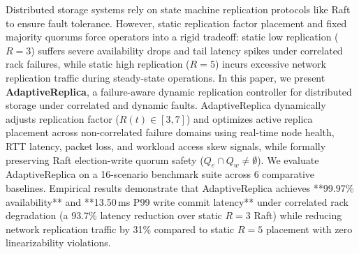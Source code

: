 Distributed storage systems rely on state machine replication protocols like Raft to ensure fault tolerance. However, static replication factor placement and fixed majority quorums force operators into a rigid tradeoff: static low replication ($R=3$) suffers severe availability drops and tail latency spikes under correlated rack failures, while static high replication ($R=5$) incurs excessive network replication traffic during steady-state operations. In this paper, we present \textbf{AdaptiveReplica}, a failure-aware dynamic replication controller for distributed storage under correlated and dynamic faults. AdaptiveReplica dynamically adjusts replication factor ($R(t) \in [3, 7]$) and optimizes active replica placement across non-correlated failure domains using real-time node health, RTT latency, packet loss, and workload access skew signals, while formally preserving Raft election-write quorum safety ($Q_e \cap Q_w \neq \emptyset$). We evaluate AdaptiveReplica on a 16-scenario benchmark suite across 6 comparative baselines. Empirical results demonstrate that AdaptiveReplica achieves **99.97\% availability** and **13.50\,ms P99 write commit latency** under correlated rack degradation (a 93.7\% latency reduction over static $R=3$ Raft) while reducing network replication traffic by 31\% compared to static $R=5$ placement with zero linearizability violations.

